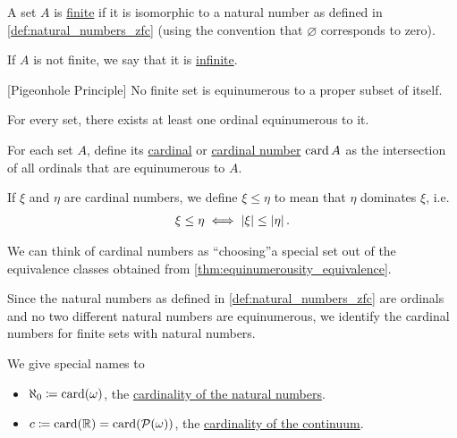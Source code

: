 \begin{definition}\label{def:finite_set}\cite[133]{Enderton1977}
  A set $A$ is \ul{finite} if it is isomorphic to a natural number as defined in \cref{def:natural_numbers_zfc} (using the convention that $\varnothing$ corresponds to zero).

  If $A$ is not finite, we say that it is \ul{infinite}.
\end{definition}

\begin{theorem}\label{def:pigeonhole_principle}[Pigeonhole Principle]\cite[Corollary 6C]{Enderton1977}
  No finite set is equinumerous to a proper subset of itself.
\end{theorem}

\begin{theorem}\label{thm:equinumerous_ordinal_existence}\cite[197]{Enderton1977}
  For every set, there exists at least one ordinal equinumerous to it.
\end{theorem}

\begin{definition}\label{def:cardinal}\cite[197]{Enderton1977}
  For each set $A$, define its \ul{cardinal} or \ul{cardinal number} $\operatorname{card} A$ as the intersection of all ordinals that are equinumerous to $A$.

  If $\xi$ and $\eta$ are cardinal numbers, we define $\xi \leq \eta$ to mean that $\eta$ dominates $\xi$, i.e.
  \begin{align*}
    \xi \leq \eta \iff \left\vert \xi \right\vert \leq \left\vert \eta \right\vert.
  \end{align*}
\end{definition}

\begin{note}\label{note:cardinals}
  We can think of cardinal numbers as \enquote{choosing}\AOC a special set out of the equivalence classes obtained from \cref{thm:equinumerousity_equivalence}.

  Since the natural numbers as defined in \cref{def:natural_numbers_zfc} are ordinals and no two different natural numbers are equinumerous, we identify the cardinal numbers for finite sets with natural numbers.

  We give special names to
  \begin{itemize}
    \item $\aleph_0 \coloneqq \operatorname{card}(\omega)$, the \ul{cardinality of the natural numbers}.
    \item $c \coloneqq \operatorname{card}(\mathbb R) = \operatorname{card}(\operatorname{\mathcal P}(\omega))$, the \ul{cardinality of the continuum}.
  \end{itemize}
\end{note}


